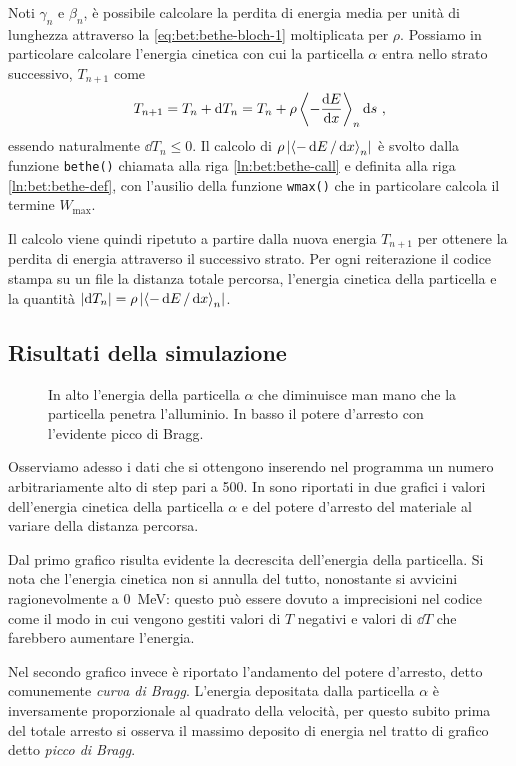         Noti $\gamma_n$ e $\beta_n$, è possibile calcolare la perdita di energia media per unità di lunghezza attraverso la \eqref{eq:bet:bethe-bloch-1} moltiplicata per $\rho$. Possiamo in particolare calcolare l'energia cinetica con cui la particella $\alpha$ entra nello strato successivo, $T_{n + 1}$ come
        \begin{equation*}
            T_{n + 1} = T_n + \dd{T_n} = T_n + \rho\, {\left\langle - \dv{E}{x} \right\rangle}_n \dd{s}
            \,,
        \end{equation*}
        essendo naturalmente $\dd{T_n} \leq 0$. Il calcolo di $\rho\,\abs{{\left\langle - \dd{E} / \dd{x} \right\rangle}_n}$ è svolto dalla funzione \texttt{bethe()} chiamata alla riga \ref{ln:bet:bethe-call} e definita alla riga \ref{ln:bet:bethe-def}, con l'ausilio della funzione \texttt{wmax()} che in particolare calcola il termine $W_\text{max}$.

        Il calcolo viene quindi ripetuto a partire dalla nuova energia $T_{n + 1}$ per ottenere la perdita di energia attraverso il successivo strato. Per ogni reiterazione il codice stampa su un file la distanza totale percorsa, l'energia cinetica della particella e la quantità $\abs{\dd{T_n}} = \rho\,\abs{{\left\langle - \dd{E} / \dd{x} \right\rangle}_n}$.

    \subsection{Risultati della simulazione}
        \begin{figure}
            \centering
            
            
            \caption{In alto l'energia della particella $\alpha$ che diminuisce man mano che la particella penetra l'alluminio. In basso il potere d'arresto con l'evidente picco di Bragg.}
            \label{fig:bet:alpha}
        \end{figure}
        Osserviamo adesso i dati che si ottengono inserendo nel programma un numero arbitrariamente alto di step pari a \num{500}. In  sono riportati in due grafici i valori dell'energia cinetica della particella $\alpha$ e del potere d'arresto del materiale al variare della distanza percorsa.
        
        Dal primo grafico risulta evidente la decrescita dell'energia della particella. Si nota che l'energia cinetica non si annulla del tutto, nonostante si avvicini ragionevolmente a \SI{0}{\mega\eV}: questo può essere dovuto a imprecisioni nel codice come il modo in cui vengono gestiti valori di $T$ negativi e valori di $\dd{T}$ che farebbero aumentare l'energia.

        Nel secondo grafico invece è riportato l'andamento del potere d'arresto, detto comunemente \emph{curva di Bragg}. L'energia depositata dalla particella $\alpha$ è inversamente proporzionale al quadrato della velocità, per questo subito prima del totale arresto si osserva il massimo deposito di energia nel tratto di grafico detto \emph{picco di Bragg}.